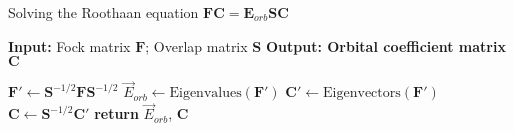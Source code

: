 \documentclass[12pt]{article}
\begin{document}
\begin{algorithm}
    \caption{Solving the Roothaan equation $\mathbf{FC} = \mathbf{E}_{orb}\mathbf{SC}$}
    \begin{algorithmic}[1]
        \Statex \textbf{Input: } Fock matrix $\mathbf{F}$; Overlap matrix $\mathbf{S}$
        \Statex \textbf{Output: Orbital coefficient matrix $\mathbf{C}$}

        \State $\mathbf{F}' \gets \mathbf{S}^{-1/2} \mathbf{F} \mathbf{S}^{-1/2}$
        \State $\vec{E}_{orb} \gets \text{Eigenvalues}(\mathbf{F}')$
        \State $\mathbf{C}' \gets \text{Eigenvectors}(\mathbf{F}')$
        \State $\mathbf{C} \gets \mathbf{S}^{-1/2}\mathbf{C}'$
        \State \textbf{return} $\vec{E}_{orb}$, $\mathbf{C}$
    \end{algorithmic}
\end{algorithm}
\end{document}
